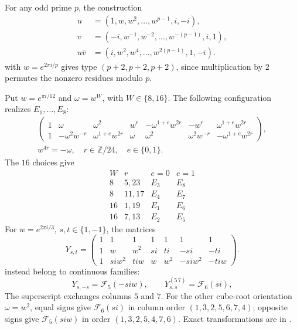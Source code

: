 \documentclass[11pt,a4paper]{article}
\theoremstyle{plain}
\theoremstyle{definition}
\numberwithin{equation}{section}
\begin{document}
For any odd prime $p$, the construction
$$
\begin{aligned}
 u&=(1,w,w^2,\ldots,w^{p-1},i,-i),\\
 v&=(-i,w^{-1},w^{-2},\ldots,w^{-(p-1)},i,1),\\
 u\bar{v}&=(i,w^2,w^4,\ldots,w^{2(p-1)},1,-i).
\end{aligned}
$$
with $w=e^{2\pi i/p}$ gives type $(p+2,p+2,p+2)$, since multiplication by $2$ permutes the nonzero residues modulo $p$.

Put $w=e^{\pi i/12}$ and $\omega=w^W$, with $W\in\{8,16\}$. The following configuration realizes $E_1,\ldots,E_8$:
$$
 \begin{gathered}\begin{pmatrix}
 1&\omega&\omega^2&w^r&-\omega^{1+e}w^{2r}&-w^r&\omega^{1+e}w^{2r}\\
 1&-\omega^2w^{-r}&\omega^{1+e}w^{2r}&\omega&\omega^2&\omega^2w^{-r}&-\omega^{1+e}w^{2r}
 \end{pmatrix},\\[4pt]
 w^{4r}=-\omega,\quad r\in\mathbb Z/24,\quad e\in\{0,1\}.\end{gathered}
$$
The $16$ choices give
$$
\begin{array}{c|c|cc}
W&r&e=0&e=1\\\hline
8&5,23&E_3&E_8\\
8&11,17&E_4&E_7\\
16&1,19&E_1&E_6\\
16&7,13&E_2&E_5
\end{array}
$$
For $w=e^{2\pi i/3}$, $s,t\in\{1,-1\}$, the matrices
$$
 Y_{s,t}=
 \begin{pmatrix}
 1&1&1&1&1&1&1\\
 1&w&w^2&si&ti&-si&-ti\\
 1&siw^2&tiw&w&w^2&-siw^2&-tiw
 \end{pmatrix}.
$$
instead belong to continuous families:
$$
 Y_{s,-s}=\mathcal F_5(-siw),\qquad
 Y_{s,s}^{(5\,7)}=\mathcal F_6(si),
$$
The superscript exchanges columns $5$ and $7$. For the other cube-root orientation $\omega=w^2$, equal signs give $\mathcal F_6(si)$ in column order $(1,3,2,5,6,7,4)$; opposite signs give $\mathcal F_5(siw)$ in order $(1,3,2,5,4,7,6)$. Exact transformations are in .
\end{document}
